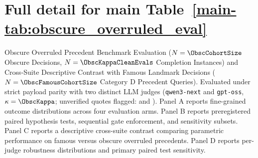 \clearpage
\section{Full detail for main Table~\ref{main-tab:obscure_overruled_eval}}
\label{detail-tab:obscure_overruled_eval}
Obscure Overruled Precedent Benchmark Evaluation ($N=\ObscCohortSize$ Obscure Decisions, $N=\ObscKappaCleanEvals$ Completion Instances) and Cross-Suite Descriptive Contrast with Famous Landmark Decisions ($N=\ObscFamousCohortSize$ Category D Precedent Queries). Evaluated under strict payload parity with two distinct LLM judges (\texttt{qwen3-next} and \texttt{gpt-oss}, $\kappa = \ObscKappa$; unverified quotes flagged: \ObscQwenUnverifiedQuotes{} and \ObscGptOssUnverifiedQuotes{}). Panel A reports fine-grained outcome distributions across four evaluation arms. Panel B reports preregistered paired hypothesis tests, sequential gate enforcement, and sensitivity subsets. Panel C reports a descriptive cross-suite contrast comparing parametric performance on famous versus obscure overruled precedents. Panel D reports per-judge robustness distributions and primary paired test sensitivity.\par\medskip
